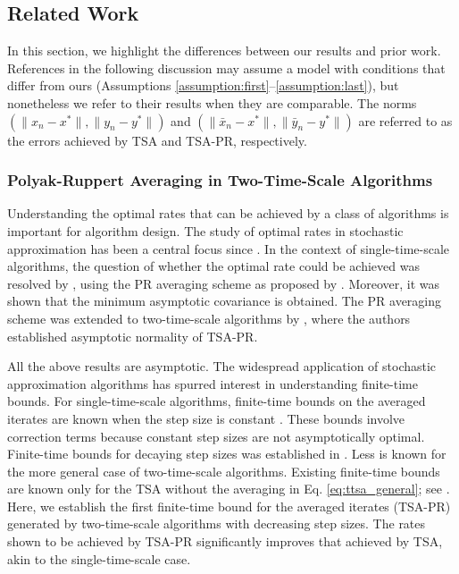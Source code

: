\subsection{Related Work}\label{sec:literature}
In this section, we highlight the differences between our results and prior work.
References in the following discussion may assume a model with conditions that differ from ours (Assumptions \ref{assumption:first}--\ref{assumption:last}), but nonetheless we refer to their results when they are comparable. 
The norms $(\lVert x_n - x^* \rVert, \lVert y_n - y^* \rVert)$ and $(\lVert \bar{x}_n - x^* \rVert, \lVert \bar{y}_n - y^*\rVert)$ are referred to as the errors achieved by TSA and TSA-PR, respectively. 


\subsubsection{Polyak-Ruppert Averaging in Two-Time-Scale Algorithms}\label{sec:PR_TTSA}
Understanding the optimal rates that can be achieved by a class of algorithms is important for algorithm design. 
The study of optimal rates in stochastic approximation has been a central focus since \citep{RobbinsMonro}. 
In the context of single-time-scale algorithms, the question of whether the optimal rate could be achieved was resolved by \citet{polyakJuditsky}, using the PR averaging scheme as proposed by \citet{ruppert,polyak}.
Moreover, it was shown that the minimum asymptotic covariance is obtained. 
The PR averaging scheme was extended to two-time-scale algorithms by \citet{mokkadem2006convergence}, where the authors established asymptotic normality of TSA-PR.



All the above results are asymptotic. 
The widespread application of stochastic approximation algorithms has spurred interest in understanding finite-time bounds. 
For single-time-scale algorithms, finite-time bounds on the averaged iterates are known when the step size is constant \citep{srikant19,mou2020linearstochasticapproximationfinegrained,durmus2024finite}.
These bounds involve correction terms because constant step sizes are not asymptotically optimal. 
Finite-time bounds for decaying step sizes was established in \citep{srikant19,chen2022finite,srikant2024CLT}.
Less is known for the more general case of two-time-scale algorithms. 
Existing finite-time bounds are known only for the TSA without the averaging in Eq. \eqref{eq:ttsa_general}; see \citep{dalal2018finite,kaledin2020finite,haque2023tightfinitetimebounds}. 
Here, we establish the first finite-time bound for the averaged iterates (TSA-PR) generated by two-time-scale algorithms with decreasing step sizes. 
The rates shown to be achieved by TSA-PR significantly improves that achieved by TSA, akin to the single-time-scale case. 





